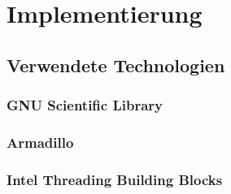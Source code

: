 \chapter{Implementierung}

\section{Verwendete Technologien}

\subsection{GNU Scientific Library}

\subsection{Armadillo}

\subsection{Intel Threading Building Blocks}